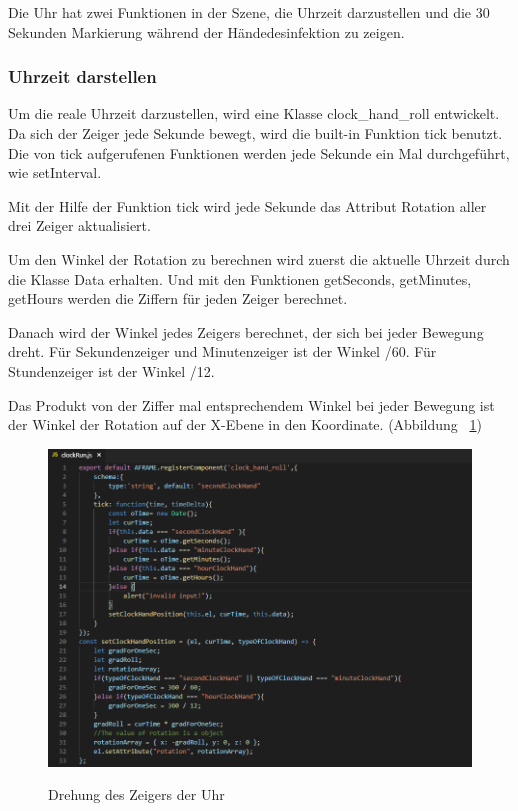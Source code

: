  Die Uhr hat zwei Funktionen in der Szene, die Uhrzeit darzustellen und die 30 Sekunden Markierung während der Händedesinfektion zu zeigen.
 
 \subsubsection{Uhrzeit darstellen}
 
 Um die reale Uhrzeit darzustellen, wird eine Klasse {\selectfont clock\_hand\_roll} entwickelt. Da sich der Zeiger jede Sekunde bewegt, wird die built-in Funktion {\selectfont tick} benutzt. Die von {\selectfont tick} aufgerufenen Funktionen werden jede Sekunde ein Mal durchgeführt, wie {\selectfont setInterval}.
 
 Mit der Hilfe der Funktion {\selectfont tick} wird jede Sekunde das Attribut {\selectfont Rotation} aller drei Zeiger aktualisiert. 
 
 Um den Winkel der Rotation zu berechnen wird zuerst die aktuelle Uhrzeit durch die Klasse {\selectfont Data} erhalten. Und mit den Funktionen {\selectfont getSeconds}, {\selectfont getMinutes}, {\selectfont getHours} werden die Ziffern für jeden Zeiger berechnet.
 
 Danach wird der Winkel jedes Zeigers berechnet, der sich bei jeder Bewegung dreht. Für Sekundenzeiger und Minutenzeiger ist der Winkel {/60}. Für Stundenzeiger ist der Winkel {/12}.
 
 Das Produkt von der Ziffer mal entsprechendem Winkel bei jeder Bewegung ist der Winkel der Rotation auf der X-Ebene in den Koordinate. (Abbildung ~\ref{fig:clockRoll})
 
\begin{figure}[ht]
\vspace*{1em}
\centering
\caption[Drehung des Zeigers der Uhr]{Drehung des Zeigers der Uhr}
\includegraphics[width=\textwidth]{images/clockRoll.png}
\label{fig:clockRoll} 
\end{figure}
 
